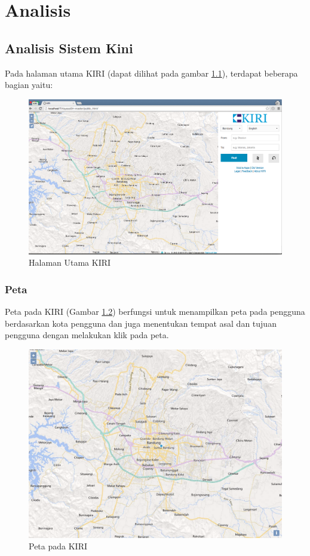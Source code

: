 \chapter{Analisis}
\label{chap:analisis}

\section{Analisis Sistem Kini}
\label{sec:analisiskini}
Pada halaman utama KIRI (dapat dilihat pada gambar \ref{fig:3_KIRI_main}), terdapat beberapa bagian yaitu:

\begin{figure}[H]
	\centering
	\includegraphics[scale=0.3]{Gambar/KIRI-main}
	\caption{Halaman Utama KIRI} 
	\label{fig:3_KIRI_main}
\end{figure}

\subsection{Peta}
Peta pada KIRI (Gambar \ref{fig:3_KIRI_peta}) berfungsi untuk menampilkan peta pada pengguna berdasarkan kota pengguna dan juga menentukan tempat asal dan tujuan pengguna dengan melakukan klik pada peta.

\begin{figure}[H]
	\centering
	\includegraphics[scale=0.5]{Gambar/KIRI-peta}
	\caption{Peta pada KIRI} 
	\label{fig:3_KIRI_peta}
\end{figure}

